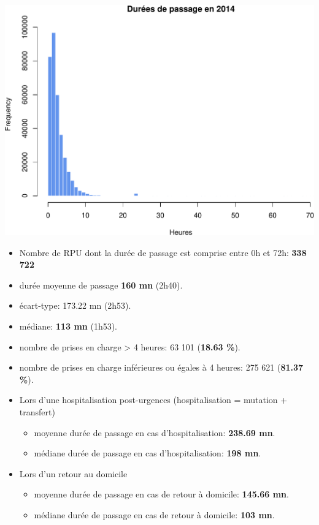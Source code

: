 \documentclass[]{article}
\begin{document}
\includegraphics{rapport2014_V4_files/figure-latex/passages-1.pdf}

\begin{itemize}
\item
  Nombre de RPU dont la durée de passage est comprise entre 0h et 72h:
  \textbf{338 722}
\item
  durée moyenne de passage \textbf{160 mn} (2h40).
\item
  écart-type: 173.22 mn (2h53).
\item
  médiane: \textbf{113 mn} (1h53).
\item
  nombre de prises en charge \textgreater{} 4 heures: 63 101
  (\textbf{18.63 \%}).
\item
  nombre de prises en charge inférieures ou égales à 4 heures: 275 621
  (\textbf{81.37 \%}).
\item
  Lors d'une hospitalisation post-urgences (hospitalisation = mutation +
  transfert)

  \begin{itemize}
  \itemsep1pt\parskip0pt
  \item
    moyenne durée de passage en cas d'hospitalisation: \textbf{238.69
    mn}.
  \item
    médiane durée de passage en cas d'hospitalisation: \textbf{198 mn}.
  \end{itemize}
\item
  Lors d'un retour au domicile

  \begin{itemize}
  \itemsep1pt\parskip0pt
  \item
    moyenne durée de passage en cas de retour à domicile: \textbf{145.66
    mn}.
  \item
    médiane durée de passage en cas de retour à domicile: \textbf{103
    mn}.
  \end{itemize}
\end{itemize}
\end{document}
